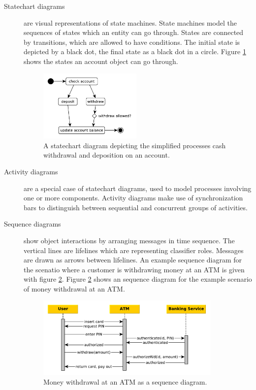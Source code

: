 \documentclass{acmtog} %
\begin{document}
\begin{description}
	\item[Statechart diagrams] are visual representations of state machines.
	State machines model the sequences of states which an entity can go through.
	States are connected by transitions, which are allowed to have conditions.
	The initial state is depicted by a black dot, the final state as a black dot in a circle.
	Figure \ref{fig:statechart-diagram} shows the states an account object can go through.
	\begin{figure}[ht]
		\centerline{\includegraphics[width=5cm]{img/uml-banking/statechart-diagram}}
		\caption{A statechart diagram depicting the simplified processes cash withdrawal and deposition on an account.}
		\label{fig:statechart-diagram}
	\end{figure}

	\item[Activity diagrams] are a special case of statechart diagrams, used to model processes involving one or more components.
	Activity diagrams make use of synchronization bars to distinguish between sequential and concurrent groups of activities.

	\item[Sequence diagrams] show object interactions by arranging messages in time sequence.
	The vertical lines are lifelines which are representing classifier roles.
	Messages are drawn as arrows between lifelines.
	An example sequence diagram for the scenatio where a customer is withdrawing money at an ATM is given with figure \ref{fig:sequence-diagram}.
	Figure \ref{fig:sequence-diagram} shows an sequence diagram for the example scenario of money withdrawal at an ATM.
	\begin{figure}[ht]
		\centerline{\includegraphics[width=9cm]{img/uml-banking/sequence-diagram}}
		\caption{Money withdrawal at an ATM as a sequence diagram.}
		\label{fig:sequence-diagram}
	\end{figure}


\end{description}
\end{document}
